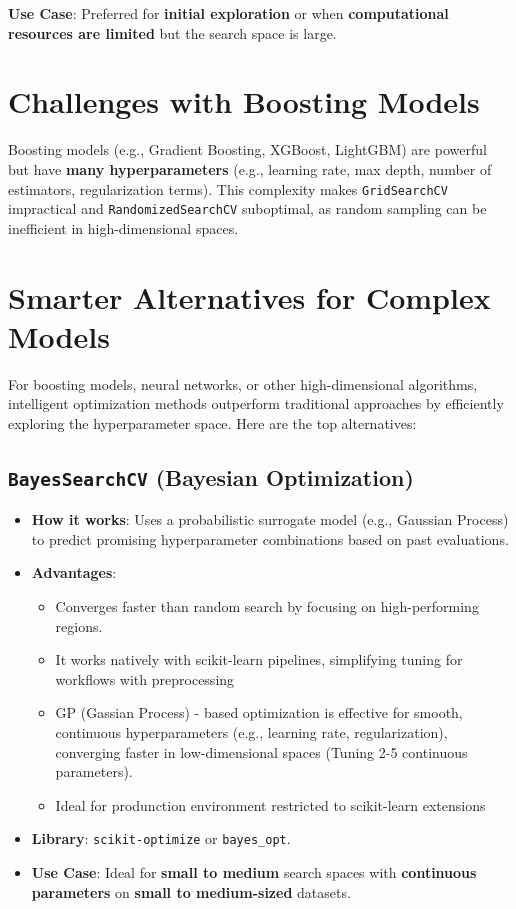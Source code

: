 \documentclass[
  letterpaper,
  DIV=11,
  numbers=noendperiod]{scrreprt}
\providecommand{\tightlist}{%
  \setlength{\itemsep}{0pt}\setlength{\parskip}{0pt}}\usepackage{longtable,booktabs,array}
\begin{document}
\textbf{Use Case}: Preferred for \textbf{initial exploration} or when
\textbf{computational resources are limited} but the search space is
large.

\section{Challenges with Boosting
Models}\label{challenges-with-boosting-models}

Boosting models (e.g., Gradient Boosting, XGBoost, LightGBM) are
powerful but have \textbf{many hyperparameters} (e.g., learning rate,
max depth, number of estimators, regularization terms). This complexity
makes \texttt{GridSearchCV} impractical and \texttt{RandomizedSearchCV}
suboptimal, as random sampling can be inefficient in high-dimensional
spaces.

\section{Smarter Alternatives for Complex
Models}\label{smarter-alternatives-for-complex-models}

For boosting models, neural networks, or other high-dimensional
algorithms, intelligent optimization methods outperform traditional
approaches by efficiently exploring the hyperparameter space. Here are
the top alternatives:

\subsection{\texorpdfstring{\texttt{BayesSearchCV} (Bayesian
Optimization)}{BayesSearchCV (Bayesian Optimization)}}\label{bayessearchcv-bayesian-optimization}

\begin{itemize}
\item
  \textbf{How it works}: Uses a probabilistic surrogate model (e.g.,
  Gaussian Process) to predict promising hyperparameter combinations
  based on past evaluations.
\item
  \textbf{Advantages}:

  \begin{itemize}
  \tightlist
  \item
    Converges faster than random search by focusing on high-performing
    regions.
  \item
    It works natively with scikit-learn pipelines, simplifying tuning
    for workflows with preprocessing
  \item
    GP (Gassian Process) - based optimization is effective for smooth,
    continuous hyperparameters (e.g., learning rate, regularization),
    converging faster in low-dimensional spaces (Tuning 2-5 continuous
    parameters).
  \item
    Ideal for produnction environment restricted to scikit-learn
    extensions
  \end{itemize}
\item
  \textbf{Library}: \texttt{scikit-optimize} or \texttt{bayes\_opt}.
\item
  \textbf{Use Case}: Ideal for \textbf{small to medium} search spaces
  with \textbf{continuous parameters} on \textbf{small to medium-sized}
  datasets.
\end{itemize}
\end{document}

